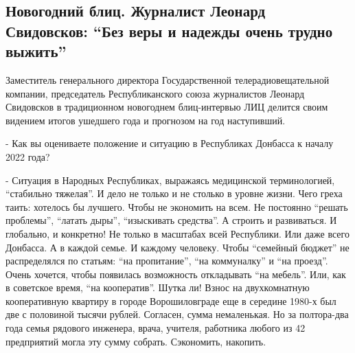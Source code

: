  
 
 
 
 
\subsection{Новогодний блиц. Журналист Леонард Свидовсков: \enquote{Без веры и надежды очень трудно выжить}}
\label{sec:04_01_2022.stz.news.lnr.lug_info.1.leonard_svidovskov_vera_nadezhda}


\begin{zznagolos}
Заместитель генерального директора Государственной телерадиовещательной
компании, председатель Республиканского союза журналистов Леонард Свидовсков в
традиционном новогоднем блиц-интервью ЛИЦ делится своим видением итогов
ушедшего года и прогнозом на год наступивший.
\end{zznagolos}

- Как вы оцениваете положение и ситуацию в Республиках Донбасса к началу 2022
года?


- Ситуация в Народных Республиках, выражаясь медицинской терминологией,
\enquote{стабильно тяжелая}. И дело не только и не столько в уровне жизни. Чего греха
таить: хотелось бы лучшего. Чтобы не экономить на всем. Не постоянно \enquote{решать
проблемы}, \enquote{латать дыры}, \enquote{изыскивать средства}. А строить и развиваться. И
глобально, и конкретно! Не только в масштабах всей Республики. Или даже всего
Донбасса. А в каждой семье. И каждому человеку. Чтобы \enquote{семейный бюджет} не
распределялся по статьям: \enquote{на пропитание}, \enquote{на коммуналку} и \enquote{на проезд}. Очень
хочется, чтобы появилась возможность откладывать \enquote{на мебель}. Или, как в
советское время, \enquote{на кооператив}. Шутка ли! Взнос на двухкомнатную
кооперативную квартиру в городе Ворошиловграде еще в середине 1980-х был две с
половиной тысячи рублей. Согласен, сумма немаленькая. Но за полтора-два года
семья рядового инженера, врача, учителя, работника любого из 42 предприятий
могла эту сумму собрать. Сэкономить, накопить.

